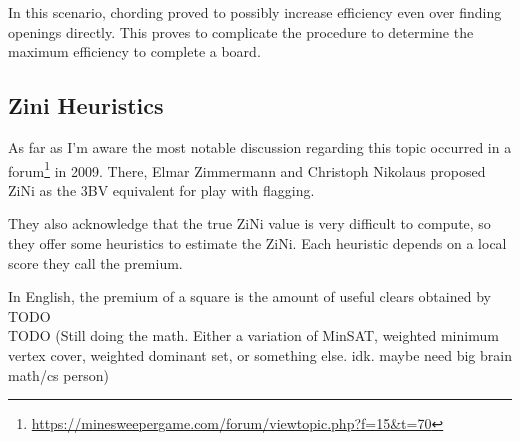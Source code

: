 In this scenario, chording proved to possibly increase efficiency even over finding openings directly. This proves to complicate the procedure to determine the maximum efficiency to complete a board.\\

\subsection{Zini Heuristics}

As far as I'm aware the most notable discussion regarding this topic occurred in a forum\footnote{\url{https://minesweepergame.com/forum/viewtopic.php?f=15&t=70}} in 2009. There, Elmar Zimmermann and Christoph Nikolaus proposed ZiNi as the 3BV equivalent for play with flagging.


They also acknowledge that the true ZiNi value is very difficult to compute, so they offer some heuristics to estimate the ZiNi. Each heuristic depends on a local score they call the premium.

In English, the premium of a square is the amount of useful clears obtained by TODO\\

TODO (Still doing the math. Either a variation of MinSAT, weighted minimum vertex cover, weighted dominant set, or something else. idk. maybe need big brain math/cs person)